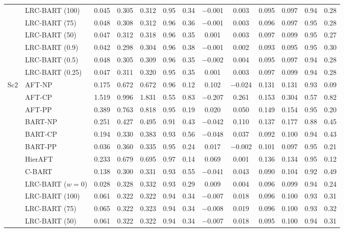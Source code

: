\documentclass[11pt]{article}
\theoremstyle{definition}
\theoremstyle{plain}
\begin{document}
\begin{center}
\begin{longtable}{llccccccccccc}
& LRC-BART (100) & 0.045 & 0.305 & 0.312 & 0.95 & 0.34 & $-$0.001 & 0.003 & 0.095 & 0.097 & 0.94 & 0.28 \\
& LRC-BART (75) & 0.048 & 0.308 & 0.312 & 0.96 & 0.36 & $-$0.001 & 0.003 & 0.096 & 0.097 & 0.95 & 0.28 \\
& LRC-BART (50) & 0.047 & 0.312 & 0.318 & 0.96 & 0.35 & 0.001 & 0.003 & 0.097 & 0.099 & 0.95 & 0.27 \\
& LRC-BART (0.9) & 0.042 & 0.298 & 0.304 & 0.96 & 0.38 & $-$0.001 & 0.002 & 0.093 & 0.095 & 0.95 & 0.30 \\
& LRC-BART (0.5) & 0.048 & 0.305 & 0.309 & 0.96 & 0.35 & $-$0.002 & 0.004 & 0.095 & 0.097 & 0.94 & 0.28 \\
& LRC-BART (0.25) & 0.047 & 0.311 & 0.320 & 0.95 & 0.35 & 0.001 & 0.003 & 0.097 & 0.099 & 0.94 & 0.28 \\
\midrule
\multirow{15}{*}{Sc2} & AFT-NP & 0.175 & 0.672 & 0.672 & 0.96 & 0.12 & 0.102 & $-$0.024 & 0.131 & 0.131 & 0.93 & 0.09 \\
& AFT-CP & 1.519 & 0.996 & 1.831 & 0.55 & 0.83 & $-$0.207 & 0.261 & 0.153 & 0.304 & 0.57 & 0.82 \\
& AFT-PP & 0.389 & 0.763 & 0.818 & 0.95 & 0.19 & 0.020 & 0.050 & 0.149 & 0.154 & 0.95 & 0.20 \\
& BART-NP & 0.251 & 0.427 & 0.495 & 0.91 & 0.43 & $-$0.042 & 0.110 & 0.137 & 0.177 & 0.88 & 0.45 \\
& BART-CP & 0.194 & 0.330 & 0.383 & 0.93 & 0.56 & $-$0.048 & 0.037 & 0.092 & 0.100 & 0.94 & 0.43 \\
& BART-PP & 0.036 & 0.360 & 0.335 & 0.95 & 0.24 & 0.017 & $-$0.002 & 0.101 & 0.097 & 0.95 & 0.21 \\
& HierAFT & 0.233 & 0.679 & 0.695 & 0.97 & 0.14 & 0.069 & 0.001 & 0.136 & 0.134 & 0.95 & 0.12 \\
& C-BART & 0.138 & 0.300 & 0.331 & 0.93 & 0.55 & $-$0.041 & 0.043 & 0.090 & 0.104 & 0.92 & 0.49 \\
& LRC-BART ($w=0$) & 0.028 & 0.328 & 0.332 & 0.93 & 0.29 & 0.009 & 0.004 & 0.096 & 0.099 & 0.94 & 0.24 \\
& LRC-BART (100) & 0.061 & 0.322 & 0.322 & 0.94 & 0.34 & $-$0.007 & 0.018 & 0.096 & 0.100 & 0.93 & 0.31 \\
& LRC-BART (75) & 0.065 & 0.322 & 0.323 & 0.94 & 0.34 & $-$0.008 & 0.019 & 0.096 & 0.100 & 0.93 & 0.32 \\
& LRC-BART (50) & 0.061 & 0.322 & 0.322 & 0.94 & 0.34 & $-$0.007 & 0.018 & 0.095 & 0.100 & 0.94 & 0.31 \\

\end{longtable}
\end{center}
\end{document}
